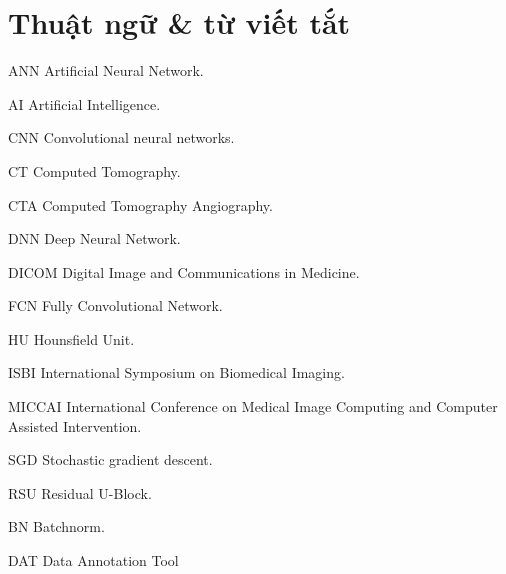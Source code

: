 \newcommand{\abbrlabel}[1]{\makebox[3cm][l]{\textbf{#1}\ \dotfill}}
\newenvironment{abbreviations}{\begin{list}{}{\renewcommand{\makelabel}{\abbrlabel}}}{\end{list}}

\chapter*{Thuật ngữ \& từ viết tắt}
\thispagestyle{empty}
\pagestyle{empty}
\vspace{1.0cm}
\begin{abbrv}
    \item[ANN] Artificial Neural Network.
    \item[AI] Artificial Intelligence.
	\item[CNN] Convolutional neural networks.
	\item[CT] Computed Tomography.
	\item[CTA] Computed Tomography Angiography.
	\item[DNN] Deep Neural Network.
	\item[DICOM] Digital Image and Communications in Medicine.
	\item[FCN] Fully Convolutional Network.
	\item[HU] Hounsfield Unit.
	\item[ISBI] International Symposium on Biomedical Imaging.
	\item[MICCAI] International Conference on Medical Image Computing and Computer Assisted Intervention.
	\item[SGD] Stochastic gradient descent.
	\item[RSU] Residual U-Block.
	\item[BN] Batchnorm.
	\item[DAT] Data Annotation Tool
\end{abbrv}
